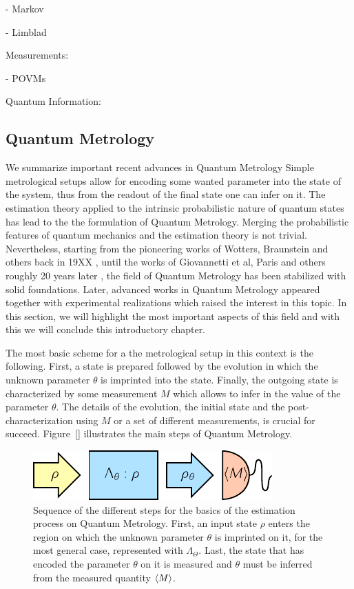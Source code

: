 - Markov

- Limblad

Measurements:

- POVMs

Quantum Information:

\subsection{Quantum Metrology}
\label{sec:bg-quantum-magnetometry}

We summarize important recent advances in Quantum Metrology
Simple metrological setups allow for encoding some wanted parameter into the state of the system, thus from the readout of the final state one can infer on it.
The estimation theory applied to the intrinsic probabilistic nature of quantum states has lead to the the formulation of Quantum Metrology.
Merging the probabilistic features of quantum mechanics and the estimation theory is not trivial.
Nevertheless, starting from the pioneering works of Wotters, Braunstein and others back in 19XX \citep{Wotters, Braunstein}, until the works of Giovannetti et al, Paris and others roughly 20 years later \citep{Giovannetti, Paris2009}, the field of Quantum Metrology has been stabilized with solid foundations.
Later, advanced works in Quantum Metrology appeared \citep{} together with experimental realizations \citep{} which raised the interest in this topic.
In this section, we will highlight the most important aspects of this field and with this we will conclude this introductory chapter.

The most basic scheme for a the metrological setup in this context is the following.
First, a state is prepared followed by the evolution in which the unknown parameter $\theta$ is imprinted into the state.
Finally, the outgoing state is characterized by some measurement $M$ which allows to infer in the value of the parameter $\theta$.
The details of the evolution, the initial state and the post-characterization using $M$ or a set of different measurements, is crucial for succeed.
Figure~\ref{} illustrates the main steps of Quantum Metrology.
\begin{figure}
  \centering
  \includegraphics[scale=1.4]{img/BG_preparation_encoding_estimation.pdf}
  \caption[Quantum Metrology estimation process]{Sequence of the different steps for the basics of the estimation process on Quantum Metrology. First, an input state $\rho$ enters the region on which the unknown parameter $\theta$ is imprinted on it, for the most general case, represented with $\Lambda_{\Theta}$. Last, the state that has encoded the parameter $\theta$ on it is measured and $\theta$ must be inferred from the measured quantity $\langle M \rangle$.}
  \label{fig:bg-preparation-encoding-estimation}
\end{figure}

